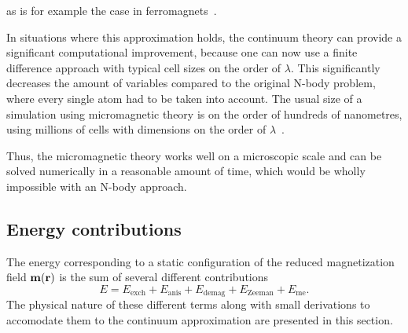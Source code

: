 \documentclass[11pt,a4paper,english]{article}
\begin{document}
as is for example the case in ferromagnets~\cite{abert2013discrete}. \par
In situations where this approximation holds, the continuum theory can provide a significant computational improvement, because one can now use a finite difference approach with typical cell sizes on the order of $\lambda$. This significantly decreases the amount of variables compared to the original N-body problem, where every single atom had to be taken into account. The usual size of a simulation using micromagnetic theory is on the order of hundreds of nanometres, using millions of cells with dimensions on the order of $\lambda$~\cite{abert2013discrete}. \par
Thus, the micromagnetic theory works well on a microscopic scale and can be solved numerically in a reasonable amount of time, which would be wholly impossible with an N-body approach.

\subsection{Energy contributions}
The energy corresponding to a static configuration of the reduced magnetization field $\vb{m}(\vb{r})$ is the sum of several different contributions
\begin{equation}
    E = E_\mathrm{exch} + E_\mathrm{anis} + E_\mathrm{demag} + E_\mathrm{Zeeman} + E_\mathrm{me} \mathrm{.} \label{eq:Energy_Terms}
\end{equation}
The physical nature of these different terms along with small derivations to accomodate them to the continuum approximation are presented in this section.
\end{document}

